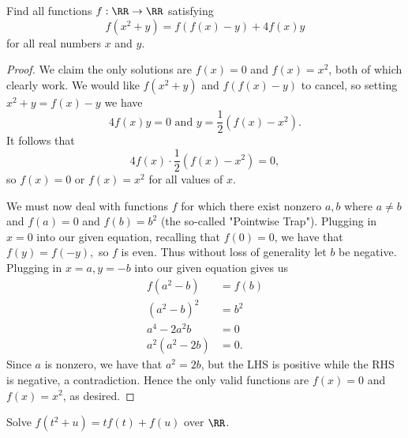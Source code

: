 \documentclass[letterpaper,oneside]{scrartcl}
\begin{document}
\newpage
\begin{problem*}
  Find all functions \(f: \RR \rightarrow \RR\) satisfying
  \[f(x^2+y) = f(f(x)-y)+4f(x)y\]
  for all real numbers \(x\) and \(y\).
\end{problem*}
\begin{proof}
  We claim the only solutions are \(f(x)=0\) and \(f(x)=x^2\), both of which clearly work. We would like \(f(x^2+y)\) and \(f(f(x)-y)\) to cancel, so setting \(x^2+y=f(x)-y\) we have
  \[4f(x)y = 0 \text{ and } y = \frac12\left(f(x)-x^2\right).\]
  It follows that
  \[4f(x)\cdot\frac12(f(x)-x^2) = 0,\]
  so \(f(x)=0\) or \(f(x)=x^2\) for all values of \(x\).

  We must now deal with functions \(f\) for which there exist nonzero \(a,b\) where \(a \neq b\) and \(f(a)=0\) and \(f(b)=b^2\) (the so-called "Pointwise Trap"). Plugging in \(x=0\) into our given equation, recalling that \(f(0)=0\), we have that \(f(y)=f(-y),\) so \(f\) is even. Thus without loss of generality let \(b\) be negative. Plugging in \(x=a, y=-b\) into our given equation gives us
  \begin{align*}
    f(a^2-b)    & = f(b) \\
    (a^2-b)^2   & = b^2  \\
    a^4-2a^2b   & = 0    \\
    a^2(a^2-2b) & = 0.
  \end{align*}
  Since \(a\) is nonzero, we have that \(a^2 = 2b\), but the LHS is positive while the RHS is negative, a contradiction. Hence the only valid functions are \(f(x)=0\) and \(f(x)=x^2\), as desired.
\end{proof}
\newpage
\begin{problem*}
  Solve \(f(t^2+u)=tf(t)+f(u)\) over \(\RR\).
\end{problem*}
\end{document}
